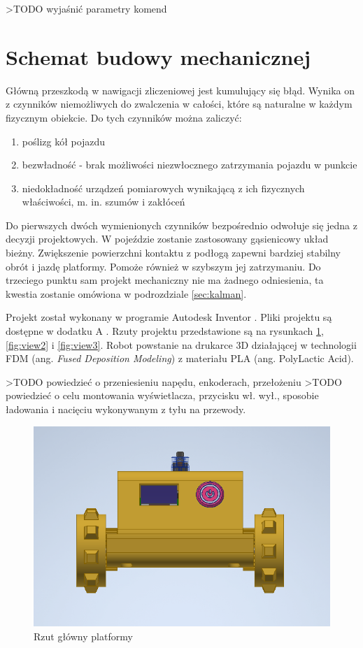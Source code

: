 >TODO wyjaśnić parametry komend

\section{Schemat budowy mechanicznej}
Główną przeszkodą w nawigacji zliczeniowej jest kumulujący się błąd. Wynika on z czynników niemożliwych do zwalczenia w całości, które są naturalne w każdym fizycznym obiekcie. Do tych czynników można zaliczyć: 
\begin{enumerate}
    \item poślizg kół pojazdu
    \item bezwładność - brak możliwości niezwłocznego zatrzymania pojazdu w punkcie
    \item niedokładność urządzeń pomiarowych wynikającą z ich fizycznych właściwości, m. in. szumów i zakłóceń
\end{enumerate}

Do pierwszych dwóch wymienionych czynników bezpośrednio odwołuje się jedna z decyzji projektowych. W pojeździe zostanie zastosowany gąsienicowy układ bieżny. Zwiększenie powierzchni kontaktu z podłogą zapewni bardziej stabilny obrót i jazdę platformy. Pomoże również w szybszym jej zatrzymaniu. Do trzeciego punktu sam projekt mechaniczny nie ma żadnego odniesienia, ta kwestia zostanie omówiona w podrozdziale \ref{sec:kalman}.

Projekt został wykonany w programie Autodesk Inventor \cite{inventor}. Pliki projektu są dostępne w dodatku A \label{sec:disc-addon}. Rzuty projektu przedstawione są na rysunkach \ref{fig:view1}, \ref{fig:view2} i \ref{fig:view3}. Robot powstanie na drukarce 3D działającej w technologii FDM (ang. \emph{Fused Deposition Modeling}) z materiału PLA (ang. PolyLactic Acid).

>TODO powiedzieć o przeniesieniu napędu, enkoderach, przełożeniu
>TODO powiedzieć o celu montowania wyświetlacza, przycisku wł. wył., sposobie ładowania i nacięciu wykonywanym z tyłu na przewody.


\begin{figure}[H]
	\centering
		\includegraphics[width=0.6\linewidth]{rys/view1.png}
	\caption{Rzut główny platformy}
	\label{fig:view1}
\end{figure}

